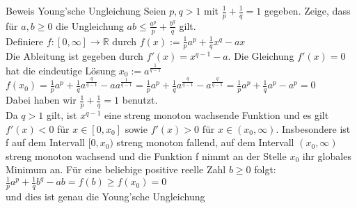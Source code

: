 \documentclass[a4paper,10pt]{article}
\def\R{\mathbb{R}}
\begin{document}
\begin{subbox}{Beweis Young'sche Ungleichung}
  Seien $p,q > 1$ mit $\frac{1}{p}+\frac{1}{q} = 1$ gegeben. Zeige, dass für $a,b\geq 0$ die Ungleichung $ab\leq\frac{a^p}{p} + \frac{b^q}{q}$ gilt.\\
  Definiere $f:[0, \infty]\to \R$ durch $f(x):= \frac{1}{p}a^p + \frac{1}{q}x^q - ax$\\
  Die Ableitung ist gegeben durch $f'(x)= x^{q-1}-a$. Die Gleichung $f'(x) = 0$ hat die eindeutige Lösung $x_0 := a^\frac{1}{q-1}$\\
  $f(x_0) = \frac{1}{p}a^p + \frac{1}{q}a^\frac{q}{q-1} - aa^\frac{1}{q-1} = \frac{1}{p}a^p + \frac{1}{q}a^\frac{q}{q-1} - a^\frac{q}{q-1} = \frac{1}{p}a^p + \frac{1}{q}a^p - a^p = 0$\\
  Dabei haben wir $\frac{1}{p} + \frac{1}{q} = 1$ benutzt.\\
  Da $q>1$ gilt, ist $x^{q-1}$ eine streng monoton wachsende Funktion und es gilt $f'(x) < 0 $ für $x\in[0, x_0]$ sowie $f'(x) > 0$ für $x\in(x_0, \infty)$. Insbesondere ist f auf dem Intervall $[0,x_0)$ streng monoton fallend, auf dem Intervall $(x_0, \infty)$ streng monoton wachsend und die Funktion f nimmt an der Stelle $x_0$ ihr globales Minimum an. Für eine beliebige positive reelle Zahl $b\geq 0$ folgt:\\
  $\frac{1}{p}a^p + \frac{1}{q}b^q -ab = f(b) \geq f(x_0) = 0$\\
  und dies ist genau die Young'sche Ungleichung
\end{subbox}
\end{document}

